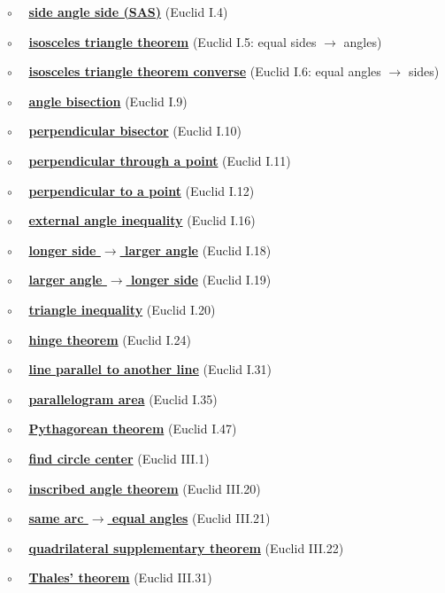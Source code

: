 \documentclass[11pt, oneside]{article}
\begin{document}
$\circ$ \ \ \hyperref[sec:Euclid4]{\textbf{side angle side (SAS)}} (Euclid I.4)

$\circ$ \ \ \hyperref[sec:Euclid5]{\textbf{isosceles triangle theorem}} (Euclid I.5:  equal sides $\rightarrow$ angles)

$\circ$ \ \ \hyperref[sec:Euclid6]{\textbf{isosceles triangle theorem converse}} (Euclid I.6:  equal angles $\rightarrow$ sides)

$\circ$ \ \ \hyperref[sec:Euclid9]{\textbf{angle bisection}} (Euclid I.9)

$\circ$ \ \ \hyperref[sec:Euclid10]{\textbf{perpendicular bisector}} (Euclid I.10)

$\circ$ \ \ \hyperref[sec:Euclid11]{\textbf{perpendicular through a point}} (Euclid I.11)

$\circ$ \ \ \hyperref[sec:Euclid12]{\textbf{perpendicular to a point}} (Euclid I.12)

$\circ$ \ \ \hyperref[sec:Euclid16]{\textbf{external angle inequality}} (Euclid I.16)

$\circ$ \ \ \hyperref[sec:Euclid18]{\textbf{longer side $\rightarrow$ larger angle}}  (Euclid I.18)

$\circ$ \ \ \hyperref[sec:Euclid19]{\textbf{larger angle $\rightarrow$ longer side}} (Euclid I.19)

$\circ$ \ \ \hyperref[sec:triangle_inequality]{\textbf{triangle inequality}} (Euclid I.20)

$\circ$ \ \ \hyperref[sec:hinge_theorem]{\textbf{hinge theorem}} (Euclid I.24)

$\circ$ \ \ \hyperref[sec:Euclid31]{\textbf{line parallel to another line}} (Euclid I.31)

$\circ$ \ \ \hyperref[sec:Euclid_I_35]{\textbf{parallelogram area}} (Euclid I.35)

$\circ$ \ \ \hyperref[sec:Euclid47]{\textbf{Pythagorean theorem}} (Euclid I.47)

$\circ$ \ \ \hyperref[sec:find_circle_center]{\textbf{find circle center}} (Euclid III.1)

$\circ$ \ \ \hyperref[sec:inscribed_angle_theorem]{\textbf{inscribed angle theorem}} (Euclid III.20)

$\circ$ \ \ \hyperref[sec:angles_on_same_arc]{\textbf{same arc $\rightarrow$ equal angles}} (Euclid III.21)

$\circ$ \ \ \hyperref[sec:quadrilateral_supplementary]{\textbf{quadrilateral supplementary theorem}} (Euclid III.22)

$\circ$ \ \ \hyperref[sec:Thales_theorem]{\textbf{Thales' theorem}} (Euclid III.31)
\end{document}
